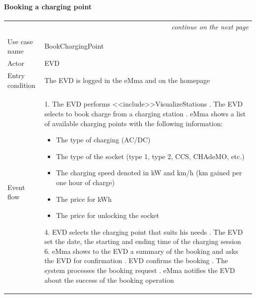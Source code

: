\paragraph{Booking a charging point}
\begin{center}
    \begin{longtable}{p{4cm} p{11cm}}
    \multicolumn{2}{r}{\itshape{continue on the next page}}\\
    \endfoot 
    \\
    \endlastfoot
    \hline
     Use case name &  BookChargingPoint\\
     \hline
     Actor & EVD \\
     \hline
     Entry condition &   The EVD is logged in the eMma and on the homepage\\
     \hline
     Event flow &
        1. The EVD performs <<include>>VisualizeStations \newline
        2. The EVD selects to book charge from a charging station \newline
        3. eMma shows a list of available charging points with the following information:
            \begin{adjustwidth}{0.5cm}{}
                \begin{itemize}
                    \item The type of charging (AC/DC)
                    \item The type of the socket (type 1, type 2, CCS, CHAdeMO, etc.)
                    \item The charging speed denoted in kW and km/h (km gained per one hour of charge)
                    \item The price for kWh
                    \item The price for unlocking the socket
                \end{itemize}
            \end{adjustwidth}
        4. EVD selects the charging point that suits his needs \newline
        5. The EVD set the date, the starting and ending time of the charging session
        6. eMma shows to the EVD a summary of the booking and asks the EVD for confirmation \newline
        7. EVD confirms the booking \newline
        8. The system processes the booking request \newline
        9. eMma notifies the EVD about the success of the booking operation\\

\end{longtable}
\end{center}

